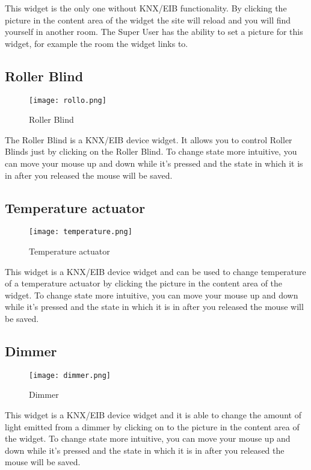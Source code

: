     This widget is the only one without KNX/EIB functionality. By clicking the picture in the content area of the widget the site will reload and you will find yourself in another room. The Super User has the ability to set a picture for this widget, for example the room the widget links to.
    \clearpage
\subsection{Roller Blind}
  \begin{figure}[h]
  \centering
  \texttt{[image: rollo.png]}
  \caption{Roller Blind}
  \label{fig:rollo}
  \end{figure}

    The Roller Blind is a KNX/EIB device widget. It allows you to control Roller Blinds just by clicking on the Roller Blind. To change state more intuitive, you can move your mouse up and down while it's pressed and the state in which it is in after you released the mouse will be saved.
    \clearpage
\subsection{Temperature actuator}
  \begin{figure}[h]
  \centering
  \texttt{[image: temperature.png]}
  \caption{Temperature actuator}
  \label{fig:temperature}
  \end{figure}

    This widget is a KNX/EIB device widget and can be used to change temperature of a temperature actuator by clicking the picture in the content area of the widget. To change state more intuitive, you can move your mouse up and down while it's pressed and the state in which it is in after you released the mouse will be saved.
    \clearpage
\subsection{Dimmer}
  \begin{figure}[h]
  \centering
  \texttt{[image: dimmer.png]}
  \caption{Dimmer}
  \label{fig:dimmer}
  \end{figure}

    This widget is a KNX/EIB device widget and it is able to change the amount of light emitted from a dimmer by clicking on to the picture in the content area of the widget. To change state more intuitive, you can move your mouse up and down while it's pressed and the state in which it is in after you released the mouse will be saved.
    \clearpage
